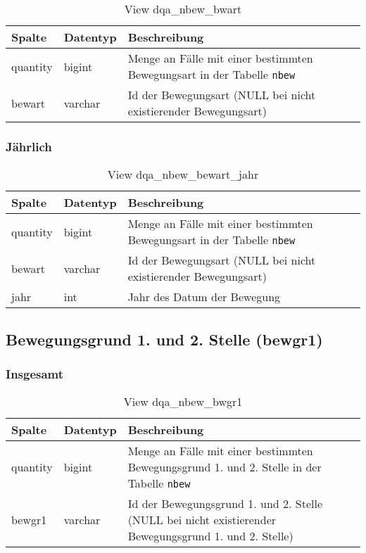 \begin{table}[ht]
	\centering   
	\caption{View dqa\_nbew\_bwart}
	\label{tab:bewArtI}
	\begin{tabular}{||l|l|p{10cm}||}   		
		\hline
		Spalte & Datentyp & Beschreibung \\ [0.5ex]
		\hline\hline
		quantity & bigint & Menge an Fälle mit einer bestimmten Bewegungsart in der Tabelle \texttt{nbew} \\
		\hline
		bewart & varchar & Id der Bewegungsart (NULL bei nicht existierender Bewegungsart)\\
		\hline
		
	\end{tabular}
\end{table}


\subsubsection{Jährlich} \label{subsubsec:bewartJ}

\begin{table}[ht]
	\centering   
	\caption{View dqa\_nbew\_bewart\_jahr}
	\label{tab:bewArtJ}
	\begin{tabular}{||l|l|p{10cm}||}   		
		\hline
		Spalte & Datentyp & Beschreibung \\ [0.5ex]
		\hline\hline
		quantity & bigint & Menge an Fälle mit einer bestimmten Bewegungsart in der Tabelle \texttt{nbew}\\
		\hline
		bewart & varchar & Id der Bewegungsart (NULL bei nicht existierender Bewegungsart)\\
		\hline
		jahr & int &  Jahr des Datum der Bewegung \\
		\hline		
	\end{tabular}
\end{table}

\subsection{Bewegungsgrund 1. und 2. Stelle (bewgr1)} \label{subsec:bewgr1}

\subsubsection{Insgesamt} \label{subsubsec:bewg1I}

\begin{table}[ht]
	\centering   
	\caption{View dqa\_nbew\_bwgr1}
	\label{tab:bewG1I}
	\begin{tabular}{||l|l|p{10cm}||}   		
		\hline
		Spalte & Datentyp & Beschreibung \\ [0.5ex]
		\hline\hline
		quantity & bigint & Menge an Fälle mit einer bestimmten Bewegungsgrund 1. und 2. Stelle in der Tabelle \texttt{nbew} \\
		\hline
		bewgr1 & varchar & Id der Bewegungsgrund 1. und 2. Stelle (NULL bei nicht existierender Bewegungsgrund 1. und 2. Stelle)\\
		\hline
		
	\end{tabular}
\end{table}

